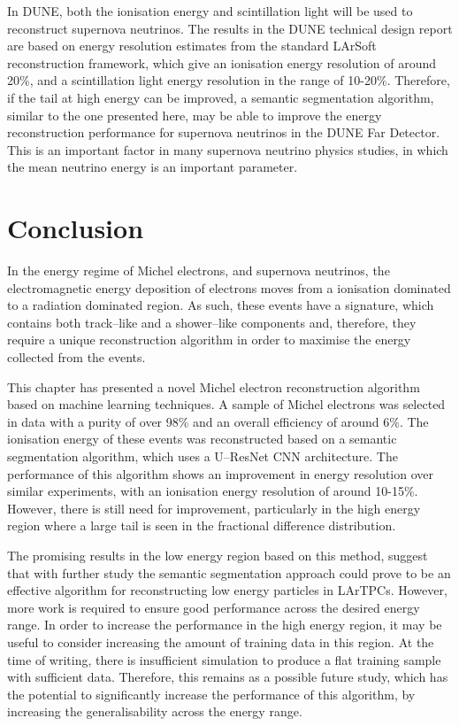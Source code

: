 In DUNE, both the ionisation energy and scintillation light will be used to
reconstruct supernova neutrinos. The results in the DUNE technical design
report are based on energy resolution estimates from the standard
LArSoft reconstruction framework, which give an ionisation energy resolution of
around 20\%, and a scintillation light energy resolution in the range of
10-20\%\cite{Abi:2020evt}. Therefore, if the tail at high energy can be
improved, a semantic segmentation algorithm, similar to the one presented
here, may be able to improve the energy reconstruction performance for
supernova neutrinos in the DUNE Far Detector. This is an important factor in
many supernova neutrino physics studies, in which the mean neutrino energy is an
important parameter\cite{Abi:2020evt}.

\section{Conclusion} \label{ME_EU}

In the energy regime of Michel electrons, and supernova neutrinos, the
electromagnetic energy deposition of electrons moves from a ionisation dominated
to a radiation dominated region. As such, these events have a signature, which
contains both track--like and a shower--like components and, therefore, they
require a unique reconstruction algorithm in order to maximise the energy
collected from the events.

This chapter has presented a novel Michel electron reconstruction algorithm 
based on machine learning techniques. A sample of Michel electrons was 
selected in \protodune{} data with a purity of over 98\% and an overall 
efficiency of around 6\%. The ionisation energy of these events was 
reconstructed based on a semantic segmentation algorithm, which uses a 
U--ResNet CNN architecture. The performance of this algorithm shows an 
improvement in energy resolution over similar experiments, with an ionisation 
energy resolution of around 10-15\%. However, there is still need for 
improvement, particularly in the high energy region where a large tail is seen 
in the fractional difference distribution.

The promising results in the low energy region based on this method, suggest
that with further study the semantic segmentation approach could prove to be an
effective algorithm for reconstructing low energy particles in LArTPCs. However,
more work is required to ensure good performance across the desired energy
range. In order to increase the performance in the high energy region, it may be
useful to consider increasing the amount of training data in this region. At the
time of writing, there is insufficient \protodune{} simulation to produce a 
flat training sample with sufficient data. Therefore, this remains as a 
possible future study, which has the potential to significantly increase the 
performance of this algorithm, by increasing the generalisability across the 
energy range.

